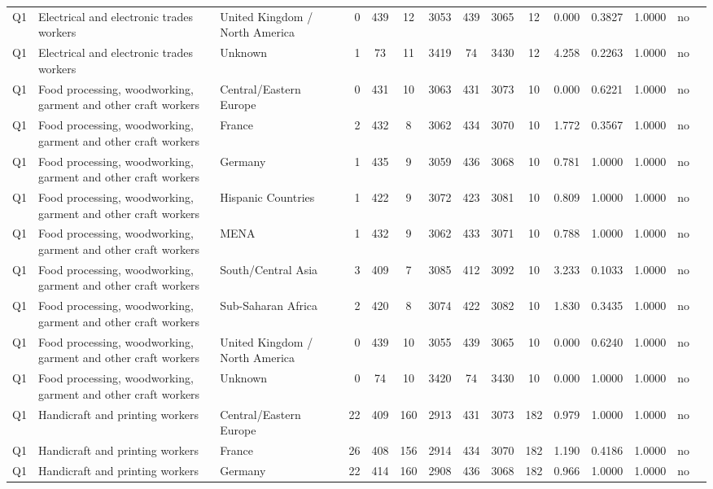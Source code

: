 \begin{longtable}{lllrcccccccccll}
Q1 & Electrical and electronic trades workers & United Kingdom / North America & 0 & 439 & 12 & 3053 & 439 & 3065 & 12 & 0.000 & 0.3827 & 1.0000 & no \\
Q1 & Electrical and electronic trades workers & Unknown & 1 & 73 & 11 & 3419 & 74 & 3430 & 12 & 4.258 & 0.2263 & 1.0000 & no \\
Q1 & Food processing, woodworking, garment and other craft workers & Central/Eastern Europe & 0 & 431 & 10 & 3063 & 431 & 3073 & 10 & 0.000 & 0.6221 & 1.0000 & no \\
Q1 & Food processing, woodworking, garment and other craft workers & France & 2 & 432 & 8 & 3062 & 434 & 3070 & 10 & 1.772 & 0.3567 & 1.0000 & no \\
Q1 & Food processing, woodworking, garment and other craft workers & Germany & 1 & 435 & 9 & 3059 & 436 & 3068 & 10 & 0.781 & 1.0000 & 1.0000 & no \\
Q1 & Food processing, woodworking, garment and other craft workers & Hispanic Countries & 1 & 422 & 9 & 3072 & 423 & 3081 & 10 & 0.809 & 1.0000 & 1.0000 & no \\
Q1 & Food processing, woodworking, garment and other craft workers & MENA & 1 & 432 & 9 & 3062 & 433 & 3071 & 10 & 0.788 & 1.0000 & 1.0000 & no \\
Q1 & Food processing, woodworking, garment and other craft workers & South/Central Asia & 3 & 409 & 7 & 3085 & 412 & 3092 & 10 & 3.233 & 0.1033 & 1.0000 & no \\
Q1 & Food processing, woodworking, garment and other craft workers & Sub-Saharan Africa & 2 & 420 & 8 & 3074 & 422 & 3082 & 10 & 1.830 & 0.3435 & 1.0000 & no \\
Q1 & Food processing, woodworking, garment and other craft workers & United Kingdom / North America & 0 & 439 & 10 & 3055 & 439 & 3065 & 10 & 0.000 & 0.6240 & 1.0000 & no \\
Q1 & Food processing, woodworking, garment and other craft workers & Unknown & 0 & 74 & 10 & 3420 & 74 & 3430 & 10 & 0.000 & 1.0000 & 1.0000 & no \\
Q1 & Handicraft and printing workers & Central/Eastern Europe & 22 & 409 & 160 & 2913 & 431 & 3073 & 182 & 0.979 & 1.0000 & 1.0000 & no \\
Q1 & Handicraft and printing workers & France & 26 & 408 & 156 & 2914 & 434 & 3070 & 182 & 1.190 & 0.4186 & 1.0000 & no \\
Q1 & Handicraft and printing workers & Germany & 22 & 414 & 160 & 2908 & 436 & 3068 & 182 & 0.966 & 1.0000 & 1.0000 & no \\

\end{longtable}
